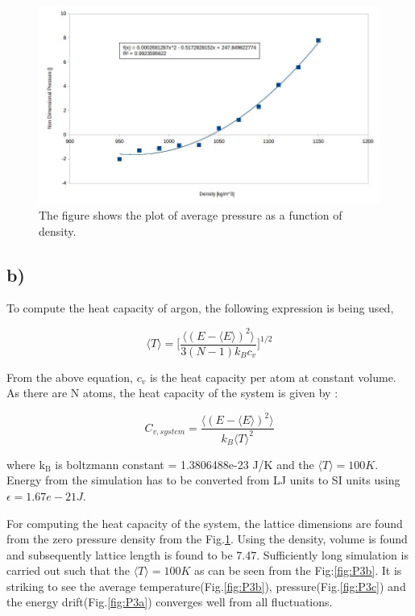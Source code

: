 \documentclass{article}
\begin{document}
\begin{figure}[htb]
\centering
\includegraphics[width=.9\linewidth]{./HM4-P2a.jpg}
\caption{\label{fig:P2a}The figure shows the plot of average pressure as a function of density.}
\end{figure}

\subsection{b)}
\label{sec-2-2}
To compute the heat capacity of argon, the following expression is being used,

\begin{equation}
\langle T \rangle = \Big[\frac{\big \langle(E-\langle E \rangle)^2 \big \rangle}{3(N-1)k_{B}c_{v}}\Big]^{1/2}
\end{equation}

From the above equation, $c_{v}$ is the heat capacity per atom at constant volume. As there are N atoms, the heat capacity of the system is given by :

\begin{equation}
C_{v,system} = \frac{\big \langle(E-\langle E \rangle)^2 \big \rangle}{k_{B}\langle T \rangle^{2}}
\end{equation}

where k$_{\text{B}}$ is boltzmann constant = 1.3806488e-23 J/K and the $\langle T \rangle = 100K$. Energy from the simulation has to be converted from LJ units to SI units using $\epsilon = 1.67e-21 J$.

For computing the heat capacity of the system, the lattice dimensions are found from the zero pressure density from the Fig.\ref{fig:P2a}. Using the density, volume is found and subsequently lattice length is found to be 7.47. Sufficiently long simulation is carried out such that the $\langle T \rangle = 100K$ as can be seen from the Fig:\ref{fig:P3b}. It is striking to see the average temperature(Fig.\ref{fig:P3b}), pressure(Fig.\ref{fig:P3c}) and the energy drift(Fig.\ref{fig:P3a}) converges well from all fluctuations.
\end{document}
